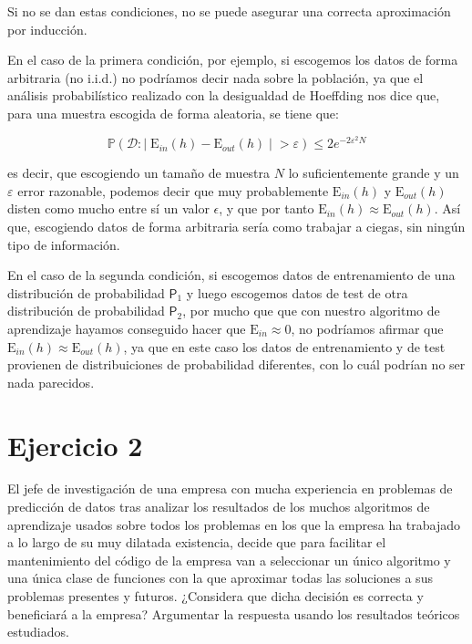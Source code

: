 \documentclass[11pt,a4paper]{article}
\newcommand{\ein}{E$_{in}$}
\newcommand{\eout}{E$_{out}$}
\newcommand{\addtoc}[1]{\addcontentsline{toc}{section}{#1}}
\begin{document}
Si no se dan estas condiciones, no se puede asegurar una correcta aproximación por inducción. 

En el caso de la primera condición, por ejemplo, si escogemos los datos de forma arbitraria (no i.i.d.) no podríamos decir nada
sobre la población, ya que el análisis probabilístico realizado con la desigualdad de Hoeffding nos dice que, para una muestra
escogida de forma aleatoria, se tiene que:

\[ \mathbb{P}(\mathcal{D}: | \; \text{E}_{in}(h) - \text{E}_{out}(h) \; | \; > \varepsilon) \leq 2e^{-2\varepsilon^2N} \]

\noindent es decir, que escogiendo un tamaño de muestra $N$ lo suficientemente grande y un $\varepsilon$ error razonable,
podemos decir que muy probablemente $\text{\ein{}}(h)$ y $\text{\eout{}}(h)$ disten como mucho entre sí un valor $\epsilon$,
y que por tanto $\text{\ein{}}(h) \approx \text{\eout{}}(h)$. Así que, escogiendo datos de forma arbitraria sería como
trabajar a ciegas, sin ningún tipo de información.

En el caso de la segunda condición, si escogemos datos de entrenamiento de una distribución de probabilidad $\mathsf{P}_1$ 
y luego escogemos datos de test de otra distribución de probabilidad $\mathsf{P}_2$, por mucho que que con nuestro 
algoritmo de aprendizaje hayamos conseguido hacer que $\text{\ein{}} \approx 0$, no podríamos afirmar que
$\text{\ein{}}(h) \approx \text{\eout{}}(h)$, ya que en este caso los datos de entrenamiento y de test provienen de
distribuiciones de probabilidad diferentes, con lo cuál podrían no ser nada parecidos.


\section*{Ejercicio 2}
\addtoc{Ejercicio 2}

\noindent El jefe de investigación de una empresa con mucha experiencia en problemas de predicción de datos tras analizar los
resultados de los muchos algoritmos de aprendizaje usados sobre todos los problemas en los que la empresa ha trabajado a lo
largo de su muy dilatada existencia, decide que para facilitar el mantenimiento del código de la empresa van a seleccionar un
único algoritmo y una única clase de funciones con la que aproximar todas las soluciones a sus problemas presentes y futuros.
¿Considera que dicha decisión es correcta y beneficiará a la empresa? Argumentar la respuesta usando los resultados teóricos
estudiados.
\end{document}
